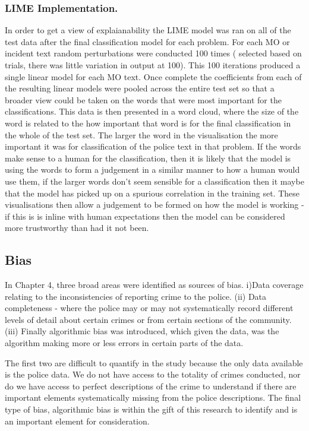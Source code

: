\subsubsection{LIME Implementation.} In order to get a view of explaianability the LIME model was ran on all of the test data after the final classification model for each problem. For each MO or incident text random perturbations were conducted 100 times ( selected based on trials, there was little variation in output at 100). This 100 iterations produced a single linear model for each MO text. Once complete the coefficients from each of the resulting linear models were pooled across the entire test set so that a broader view could be taken on the words that were most important for the classifications. This data is then presented in a word cloud, where the size of the word is related to the how important that word is for the final classification in the whole of the test set. The larger the word in the visualisation the more important it was for classification of the police text in that problem. If the words make sense to a human for the classification, then it is likely that the model is using the words to form a judgement in a similar manner to how a human would use them, if the larger words don't seem sensible for a classification then it maybe that the model has picked up on a spurious correlation in the training set. These visualisations then allow a judgement to be formed on how the model is working - if this is is inline with human expectations then the model can be considered more trustworthy than had it not been. 

\subsection{Bias}In Chapter 4, three broad areas were identified as sources of bias. i)Data coverage relating to the inconsistencies of reporting crime to the police. (ii) Data completeness - where the police may or may not systematically record different levels of detail about certain crimes or from certain sections of the community. (iii) Finally algorithmic bias was introduced, which given the data, was the algorithm making more or less errors in certain parts of the data. 

The first two are difficult to quantify in the study because the only data available is the police data. We do not have access to the totality of crimes conducted, nor do we have access to perfect descriptions of the crime to understand if there are important elements systematically missing from the police descriptions. The final type of bias, algorithmic bias is within the gift of this research to identify and is an important element for consideration. 

